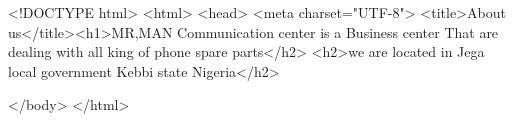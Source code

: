 <!DOCTYPE html>
<html>
<head>
	 <meta charset="UTF-8">
    <title>About us</title><h1>MR,MAN Communication center is a Business center That are dealing with all king of phone spare parts</h2>
   <h2>we are located in Jega local government Kebbi state Nigeria</h2>
   
</body>
</html>
